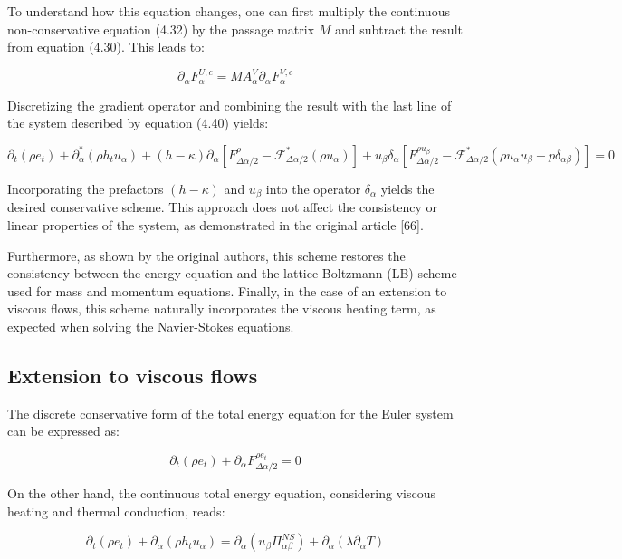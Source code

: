 To understand how this equation changes, one can first multiply the continuous
non-conservative equation (4.32) by the passage matrix \( M \) and subtract the
result from equation (4.30). This leads to:

\begin{equation}
    \partial_\alpha F_\alpha^{U,c} = MA_\alpha^V \partial_\alpha F_\alpha^{V,c}
\end{equation}

Discretizing the gradient operator and combining the result with the last line
of the system described by equation (4.40) yields:

\begin{equation}
    \partial_t(\rho e_t) + \partial_\alpha^*(\rho h_t u_\alpha) 
    + (h-\kappa)\partial_\alpha[F_{\Delta\alpha/2}^\rho - \mathcal{F}_{\Delta\alpha/2}^*(\rho u_\alpha)]
    + u_\beta\delta_\alpha[F_{\Delta\alpha/2}^{\rho u_\beta} - \mathcal{F}_{\Delta\alpha/2}^*(\rho u_\alpha u_\beta + p\delta_{\alpha\beta})] = 0
\end{equation}

Incorporating the prefactors \((h - \kappa)\) and \( u_\beta \) into the
operator \(\delta_\alpha\) yields the desired conservative scheme. This approach
does not affect the consistency or linear properties of the system, as
demonstrated in the original article [66]. 

Furthermore, as shown by the original authors, this scheme restores the
consistency between the energy equation and the lattice Boltzmann (LB) scheme
used for mass and momentum equations. Finally, in the case of an extension to
viscous flows, this scheme naturally incorporates the viscous heating term, as
expected when solving the Navier-Stokes equations.


\subsection{Extension to viscous flows}

The discrete conservative form of the total energy equation for the Euler system
can be expressed as:

\begin{equation}
    \partial_t(\rho e_t) + \partial_\alpha F_{\Delta\alpha/2}^{\rho e_t} = 0
\end{equation}

On the other hand, the continuous total energy equation, considering viscous
heating and thermal conduction, reads:

\begin{equation}
    \partial_t(\rho e_t) + \partial_\alpha (\rho h_t u_\alpha) = \partial_\alpha (u_\beta \Pi_{\alpha\beta}^{NS}) + \partial_\alpha (\lambda \partial_\alpha T)
\end{equation}


